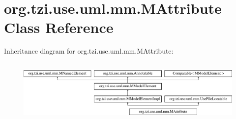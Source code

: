 \hypertarget{classorg_1_1tzi_1_1use_1_1uml_1_1mm_1_1_m_attribute}{\section{org.\-tzi.\-use.\-uml.\-mm.\-M\-Attribute Class Reference}
\label{classorg_1_1tzi_1_1use_1_1uml_1_1mm_1_1_m_attribute}
}
Inheritance diagram for org.\-tzi.\-use.\-uml.\-mm.\-M\-Attribute\-:\begin{figure}[H]
\begin{center}
\leavevmode
\includegraphics[height=3.111111cm]{classorg_1_1tzi_1_1use_1_1uml_1_1mm_1_1_m_attribute}
\end{center}
\end{figure}
